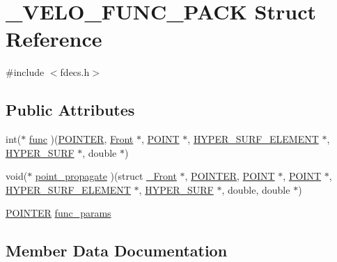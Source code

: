 \hypertarget{struct___v_e_l_o___f_u_n_c___p_a_c_k}{}\section{\+\_\+\+V\+E\+L\+O\+\_\+\+F\+U\+N\+C\+\_\+\+P\+A\+CK Struct Reference}
\label{struct___v_e_l_o___f_u_n_c___p_a_c_k}


{\ttfamily \#include $<$fdecs.\+h$>$}

\subsection*{Public Attributes}
\begin{DoxyCompactItemize}
\item 
int($\ast$ \hyperlink{struct___v_e_l_o___f_u_n_c___p_a_c_k_a6c439631360f812cfd623b2e4669c785}{func} )(\hyperlink{cdecs_8h_ae51a81000f343b8ec43bca1f6a723d7b}{P\+O\+I\+N\+T\+ER}, \hyperlink{fdecs_8h_ac32202b798f848095c489cfd04c4ca5f}{Front} $\ast$, \hyperlink{int_8h_a3a87c5c9d0146e30a4bf720f701e5a63}{P\+O\+I\+NT} $\ast$, \hyperlink{int_8h_a17e21ae7174174d7a55516f8c9a8f12f}{H\+Y\+P\+E\+R\+\_\+\+S\+U\+R\+F\+\_\+\+E\+L\+E\+M\+E\+NT} $\ast$, \hyperlink{int_8h_acef50fa4757ce0d3f75c97fab5a175bc}{H\+Y\+P\+E\+R\+\_\+\+S\+U\+RF} $\ast$, double $\ast$)
\item 
void($\ast$ \hyperlink{struct___v_e_l_o___f_u_n_c___p_a_c_k_aff697b804ce3573e2ace18027763606c}{point\+\_\+propagate} )(struct \hyperlink{struct___front}{\+\_\+\+Front} $\ast$, \hyperlink{cdecs_8h_ae51a81000f343b8ec43bca1f6a723d7b}{P\+O\+I\+N\+T\+ER}, \hyperlink{int_8h_a3a87c5c9d0146e30a4bf720f701e5a63}{P\+O\+I\+NT} $\ast$, \hyperlink{int_8h_a3a87c5c9d0146e30a4bf720f701e5a63}{P\+O\+I\+NT} $\ast$, \hyperlink{int_8h_a17e21ae7174174d7a55516f8c9a8f12f}{H\+Y\+P\+E\+R\+\_\+\+S\+U\+R\+F\+\_\+\+E\+L\+E\+M\+E\+NT} $\ast$, \hyperlink{int_8h_acef50fa4757ce0d3f75c97fab5a175bc}{H\+Y\+P\+E\+R\+\_\+\+S\+U\+RF} $\ast$, double, double $\ast$)
\item 
\hyperlink{cdecs_8h_ae51a81000f343b8ec43bca1f6a723d7b}{P\+O\+I\+N\+T\+ER} \hyperlink{struct___v_e_l_o___f_u_n_c___p_a_c_k_a47fdc170d348b8a0e417d182c31ad2b4}{func\+\_\+params}
\end{DoxyCompactItemize}


\subsection{Member Data Documentation}
